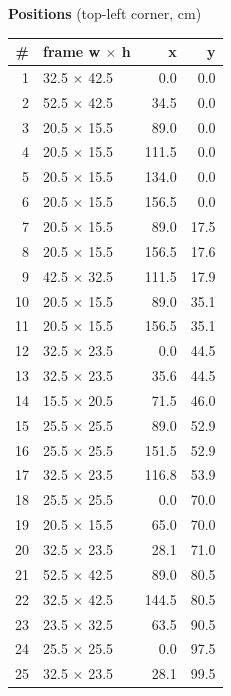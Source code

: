 \documentclass[a4paper,landscape,10pt]{article}
\begin{document}
\begin{minipage}[t]{0.25\textwidth}
\vspace{8pt}
{\bfseries Positions} (top-left corner, cm)\\[2pt]
\tiny
\begin{tabular}{@{}r l r r@{}}
\toprule
\# & frame w $\times$ h & x & y \\
\midrule
1 & 32.5 $\times$ 42.5 & 0.0 & 0.0 \\
2 & 52.5 $\times$ 42.5 & 34.5 & 0.0 \\
3 & 20.5 $\times$ 15.5 & 89.0 & 0.0 \\
4 & 20.5 $\times$ 15.5 & 111.5 & 0.0 \\
5 & 20.5 $\times$ 15.5 & 134.0 & 0.0 \\
6 & 20.5 $\times$ 15.5 & 156.5 & 0.0 \\
7 & 20.5 $\times$ 15.5 & 89.0 & 17.5 \\
8 & 20.5 $\times$ 15.5 & 156.5 & 17.6 \\
9 & 42.5 $\times$ 32.5 & 111.5 & 17.9 \\
10 & 20.5 $\times$ 15.5 & 89.0 & 35.1 \\
11 & 20.5 $\times$ 15.5 & 156.5 & 35.1 \\
12 & 32.5 $\times$ 23.5 & 0.0 & 44.5 \\
13 & 32.5 $\times$ 23.5 & 35.6 & 44.5 \\
14 & 15.5 $\times$ 20.5 & 71.5 & 46.0 \\
15 & 25.5 $\times$ 25.5 & 89.0 & 52.9 \\
16 & 25.5 $\times$ 25.5 & 151.5 & 52.9 \\
17 & 32.5 $\times$ 23.5 & 116.8 & 53.9 \\
18 & 25.5 $\times$ 25.5 & 0.0 & 70.0 \\
19 & 20.5 $\times$ 15.5 & 65.0 & 70.0 \\
20 & 32.5 $\times$ 23.5 & 28.1 & 71.0 \\
21 & 52.5 $\times$ 42.5 & 89.0 & 80.5 \\
22 & 32.5 $\times$ 42.5 & 144.5 & 80.5 \\
23 & 23.5 $\times$ 32.5 & 63.5 & 90.5 \\
24 & 25.5 $\times$ 25.5 & 0.0 & 97.5 \\
25 & 32.5 $\times$ 23.5 & 28.1 & 99.5 \\
\bottomrule
\end{tabular}
\end{minipage}
\clearpage
\end{document}

